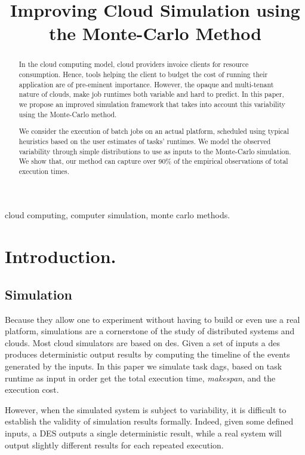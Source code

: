 \documentclass[10pt,conference,compsocconf]{IEEEtran}
\title{Improving Cloud Simulation using the Monte-Carlo Method}
\author{\IEEEauthorblockN{Luke~Bertot 
			and Stéphane~Genaud 
			and Julien~Gossa}
	\IEEEauthorblockA{Icube-ICPS --- UMR 7357, Univeristé de Strasbourg, CNRS\\
		P\^ole API Blvd S. Bant, 67400 Illkirch-Graffenstaden\\
		email: \url{lbertot@unistra.fr}, \url{genaud@unistra.fr}, \url{gossa@unistra.fr}}
	}
\begin{document}
\maketitle

\begin{abstract}
  In the  cloud computing  model, cloud providers  invoice clients  for resource
  consumption. Hence, tools helping the client to budget the cost of running
  their application are  of pre-eminent  importance. However, the opaque and
  multi-tenant nature of clouds, make job runtimes both variable and hard to
  predict.  In this  paper, we  propose an improved simulation framework that
  takes into account  this variability using the Monte-Carlo method.

  We consider  the execution of batch jobs on  an actual platform, scheduled
  using typical  heuristics based  on the  user estimates  of tasks' runtimes. We
  model  the observed  variability through  simple  distributions to use  as
  inputs  to the  Monte-Carlo  simulation. We show that, our method can capture 
  over  90\% of the empirical observations of total execution times.
\end{abstract}

\begin{IEEEkeywords}
cloud computing, computer simulation, monte carlo methods.
\end{IEEEkeywords}


\section{Introduction.}

\subsection{Simulation}

Because they allow one to experiment without having to build or even use a real 
platform, simulations are a cornerstone of the study of distributed
systems and clouds.  
Most cloud simulators  are based on \ac{des}. Given a set of inputs a \ac{des}
produces deterministic output results by computing the timeline of the events
generated by the inputs.  In this paper
we simulate task \acp{dag}, based on task runtime as input in order get the total
execution time, \emph{makespan}, and the execution cost.

However, when the simulated system is subject to variability, it is difficult
to establish  the  validity of  simulation  results formally. Indeed, given some
defined inputs, a DES outputs a single deterministic result, while a real system
will output  slightly different results for each repeated execution.
\end{document}
